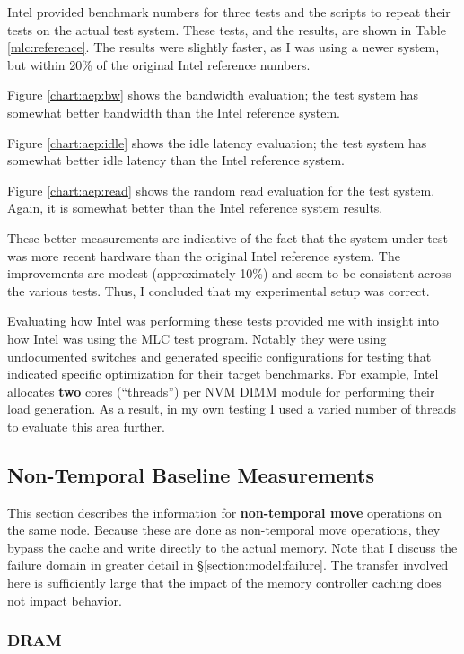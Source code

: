 Intel provided benchmark numbers for three tests and the scripts to repeat their tests
on the actual test system. These tests, and the results, are shown in Table \ref{mlc:reference}.
The results were slightly faster, as I was using a newer system, but within 20\% of the original
Intel reference numbers.

Figure \ref{chart:aep:bw} shows the bandwidth evaluation; the test system has somewhat better bandwidth than the Intel reference system.

Figure \ref{chart:aep:idle} shows the idle latency evaluation; the test system has somewhat better idle latency than the Intel reference system.

Figure \ref{chart:aep:read} shows the random read evaluation for the
test system.  Again, it is somewhat better than the Intel reference
system results.

These better measurements are indicative of the fact that the system
under test was more recent hardware than the original Intel reference
system.  The improvements are modest (approximately 10\%) and seem
to be consistent across the various tests.  Thus, I concluded that my
experimental setup was correct.

Evaluating how Intel was performing these tests provided me with
insight into how Intel was using the \acs{MLC} test program.  Notably
they were using undocumented switches and generated specific
configurations for testing that indicated specific optimization for
their target benchmarks.  For example, Intel allocates \textbf{two}
cores (``threads'') per NVM DIMM module for performing their load
generation.  As a result, in my own testing I used a varied number of
threads to evaluate this area further.

\subsection{Non-Temporal Baseline Measurements}

This section describes the information for \textbf{non-temporal move}
operations on the same node. Because these are done as non-temporal
move operations, they bypass the cache and write directly to the actual
memory.  Note that I discuss the failure domain in greater detail in 
\S \ref{section:model:failure}.
The transfer involved here is sufficiently large that the impact of 
the memory controller caching does not impact behavior.


\subsubsection{DRAM}\label{baseline:dram}

